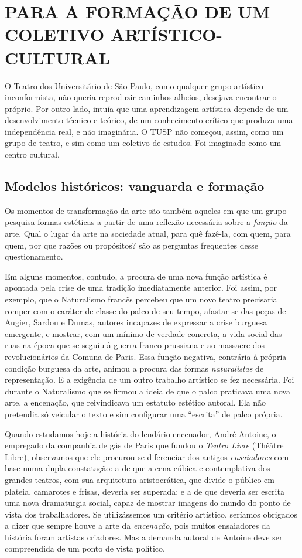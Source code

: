 \chapter{PARA A FORMAÇÃO DE UM COLETIVO ARTÍSTICO-CULTURAL}

O Teatro dos Universitário de São Paulo, como qualquer grupo artístico
inconformista, não queria reproduzir caminhos alheios, desejava
encontrar o próprio. Por outro lado, intuía que uma aprendizagem
artística depende de um desenvolvimento técnico e teórico, de um
conhecimento crítico que produza uma independência real, e não
imaginária. O TUSP não começou, assim, como um grupo de teatro, e sim
como um coletivo de estudos. Foi imaginado como um centro cultural.

\section{Modelos históricos: vanguarda e formação}

Os momentos de transformação da arte são também aqueles em que um grupo
pesquisa formas estéticas a partir de uma reflexão necessária sobre a
\textit{função} da arte. Qual o lugar da arte na sociedade atual, para quê
fazê-la, com quem, para quem, por que razões ou propósitos? são as
perguntas frequentes desse questionamento.

Em alguns momentos, contudo, a procura de uma nova função artística é
apontada pela crise de uma tradição imediatamente anterior. Foi assim,
por exemplo, que o Naturalismo francês percebeu que um novo teatro
precisaria romper com o caráter de classe do palco de seu tempo,
afastar-se das peças de Augier, Sardou e Dumas, autores incapazes de
expressar a crise burguesa emergente, e mostrar, com um mínimo de
verdade concreta, a vida social das ruas na época que se seguiu à guerra
franco-prussiana e ao massacre dos revolucionários da Comuna de Paris.
Essa função negativa, contrária à própria condição burguesa da arte,
animou a procura das formas \textit{naturalistas} de representação. E a
exigência de um outro trabalho artístico se fez necessária. Foi durante
o Naturalismo que se firmou a ideia de que o palco praticava uma nova
arte, a encenação, que reivindicava um estatuto estético autoral. Ela
não pretendia só veicular o texto e sim configurar uma “escrita” de
palco própria.

Quando estudamos hoje a história do lendário encenador, André Antoine, o
empregado da companhia de gás de Paris que fundou o \textit{Teatro Livre}
(Théâtre Libre), observamos que ele procurou se diferenciar dos antigos
\textit{ensaiadores} com base numa dupla constatação: a de que a cena
cúbica e contemplativa dos grandes teatros, com sua arquitetura
aristocrática, que divide o público em plateia, camarotes e frisas,
deveria ser superada; e a de que deveria ser escrita uma nova
dramaturgia social, capaz de mostrar imagens do mundo do ponto de vista
dos trabalhadores. Se utilizássemos um critério artístico, seríamos
obrigados a dizer que sempre houve a arte da \textit{encenação}, pois
muitos ensaiadores da história foram artistas criadores. Mas a demanda
autoral de Antoine deve ser compreendida de um ponto de vista político.

